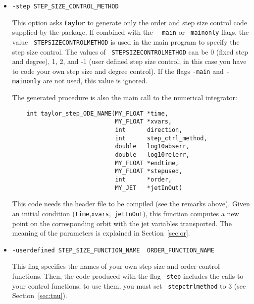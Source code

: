 \documentclass[10pt]{article}
\theoremstyle{remark}
\newcommand{\taylorname}{{\bf taylor}}
\begin{document}
\begin{itemize}
{This option asks \taylorname{} to generate only the \verb+main()+
driving routine. It is useful when you want to separate different
modules in different files. The main driving routine has to be linked
with the step size control procedure and the jet derivative procedure
to run.  }

\item{\verb+-step STEP_SIZE_CONTROL_METHOD+

This option asks \taylorname{} to generate only the order and step
size control code supplied by the package. If combined with the {\tt
  -main} or {\tt -mainonly} flags, the value {\tt
  STEPSIZECONTROLMETHOD} is used in
the main program to specify the step size control. The values of {\tt
  STEPSIZECONTROLMETHOD} can be 0
(fixed step and degree), 1, 2, and -1 (user defined step size control;
in this case you have to code your own step size and degree
control). If the flags {\tt -main} and {\tt -mainonly} are
not used, this value is ignored.

The generated procedure is also the main call to the numerical
integrator:
\begin{verbatim}
    int taylor_step_ODE_NAME(MY_FLOAT *time,
                             MY_FLOAT *xvars,
                             int      direction,
                             int      step_ctrl_method,
                             double   log10abserr,
                             double   log10relerr,
                             MY_FLOAT *endtime,
                             MY_FLOAT *stepused,
                             int      *order,
                             MY_JET   *jetInOut)
\end{verbatim}
This code needs the header file to be compiled (see the remarks
above). Given an initial condition ({\tt time},{\tt xvars},{\tt
  jetInOut}), this function computes a new point on the corresponding
orbit with the jet variables transported. The meaning of the
parameters is explained in Section~\ref{sec:or}.  }

\item{\verb+-userdefined STEP_SIZE_FUNCTION_NAME  ORDER_FUNCTION_NAME+

This flag specifies the names of your own step size and order control
functions. Then, the code produced with the flag {\tt -step} includes
the calls to your control functions; to use them, you must set {\tt
  stepctrlmethod} to 3 (see
Section~\ref{sec:tnu}).

}
\end{itemize}
\end{document}
